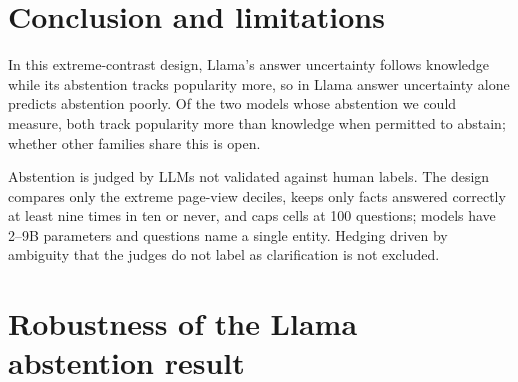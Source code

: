 \documentclass{article}
\begin{document}
\section{Conclusion and limitations}

In this extreme-contrast design, Llama's answer uncertainty follows knowledge while its abstention tracks popularity more, so in Llama answer uncertainty alone predicts abstention poorly. Of the two models whose abstention we could measure, both track popularity more than knowledge when permitted to abstain; whether other families share this is open.

Abstention is judged by LLMs not validated against human labels. The design compares only the extreme page-view deciles, keeps only facts answered correctly at least nine times in ten or never, and caps cells at 100 questions; models have 2--9B parameters and questions name a single entity. Hedging driven by ambiguity that the judges do not label as clarification is not excluded.




\appendix

\section{Robustness of the Llama abstention result}
\label{app:robust}
\end{document}
